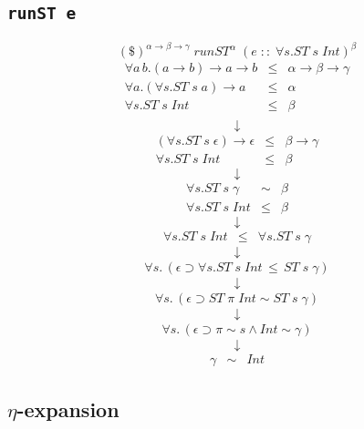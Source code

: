 \documentclass[12pt]{article}
\begin{document}
\subsection{\tt runST e}
$$(\$)^{\alpha \to \beta \to \gamma} \; runST^\alpha \; \left( e \; :: \; \forall s. ST \; s \; Int \right)^\beta$$
$$\begin{array}{rcl}
\forall a \, b. (a \to b) \to a \to b & \leq & \alpha \to \beta \to \gamma \\
\forall a. \left( \forall s. ST \; s \; a \right) \to a & \leq & \alpha \\
\forall s. ST \; s \; Int & \leq & \beta \\
\end{array}$$
$$\downarrow$$
$$\begin{array}{rcl}
\left( \forall s. ST \; s \; \epsilon \right) \to \epsilon & \leq & \beta \to \gamma \\
\forall s. ST \; s \; Int & \leq & \beta
\end{array}$$
$$\downarrow$$
$$\begin{array}{rcl}
\forall s. ST \; s \; \gamma & \sim & \beta \\
\forall s. ST \; s \; Int & \leq & \beta
\end{array}$$
$$\downarrow$$
$$\begin{array}{rcl}
\forall s. ST \; s \; Int & \leq & \forall s. ST \; s \; \gamma
\end{array}$$
$$\downarrow$$
$$\begin{array}{rcl}
\forall s. \, \left( \epsilon \supset \forall s. ST \; s \; Int \, \leq \, ST \; s \; \gamma \right)
\end{array}$$
$$\downarrow$$
$$\begin{array}{rcl}
\forall s. \, \left( \epsilon \supset ST \; \pi \; Int \sim ST \; s \; \gamma \right)
\end{array}$$
$$\downarrow$$
$$\begin{array}{rcl}
\forall s. \, \left( \epsilon \supset \pi \sim s \wedge Int \sim \gamma  \right)
\end{array}$$
$$\downarrow$$
$$\begin{array}{rcl}
\gamma & \sim & Int
\end{array}$$

\subsection{$\eta$-expansion}
\end{document}
